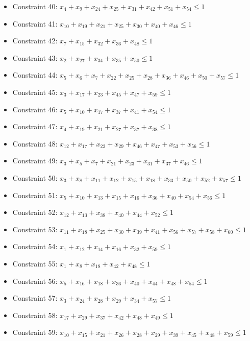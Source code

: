 \documentclass[11pt]{article}
\begin{document}
\begin{itemize}
\item Constraint 40: $x_{4} + x_{9} + x_{24} + x_{25} + x_{31} + x_{42} + x_{51} + x_{54} \le 1$
\item Constraint 41: $x_{10} + x_{19} + x_{21} + x_{25} + x_{30} + x_{40} + x_{46} \le 1$
\item Constraint 42: $x_{7} + x_{15} + x_{32} + x_{36} + x_{48} \le 1$
\item Constraint 43: $x_{2} + x_{27} + x_{34} + x_{35} + x_{50} \le 1$
\item Constraint 44: $x_{5} + x_{6} + x_{7} + x_{22} + x_{25} + x_{28} + x_{36} + x_{46} + x_{50} + x_{57} \le 1$
\item Constraint 45: $x_{3} + x_{17} + x_{23} + x_{45} + x_{47} + x_{59} \le 1$
\item Constraint 46: $x_{5} + x_{10} + x_{17} + x_{37} + x_{41} + x_{54} \le 1$
\item Constraint 47: $x_{4} + x_{19} + x_{21} + x_{27} + x_{37} + x_{38} \le 1$
\item Constraint 48: $x_{12} + x_{17} + x_{22} + x_{29} + x_{46} + x_{47} + x_{53} + x_{56} \le 1$
\item Constraint 49: $x_{3} + x_{5} + x_{7} + x_{21} + x_{23} + x_{31} + x_{37} + x_{46} \le 1$
\item Constraint 50: $x_{3} + x_{8} + x_{11} + x_{12} + x_{15} + x_{18} + x_{33} + x_{50} + x_{52} + x_{57} \le 1$
\item Constraint 51: $x_{5} + x_{10} + x_{13} + x_{15} + x_{16} + x_{36} + x_{40} + x_{54} + x_{56} \le 1$
\item Constraint 52: $x_{12} + x_{13} + x_{38} + x_{40} + x_{44} + x_{52} \le 1$
\item Constraint 53: $x_{11} + x_{18} + x_{25} + x_{30} + x_{39} + x_{41} + x_{56} + x_{57} + x_{58} + x_{60} \le 1$
\item Constraint 54: $x_{1} + x_{12} + x_{14} + x_{16} + x_{32} + x_{59} \le 1$
\item Constraint 55: $x_{1} + x_{8} + x_{18} + x_{42} + x_{48} \le 1$
\item Constraint 56: $x_{5} + x_{16} + x_{18} + x_{36} + x_{40} + x_{44} + x_{48} + x_{54} \le 1$
\item Constraint 57: $x_{3} + x_{24} + x_{28} + x_{29} + x_{34} + x_{57} \le 1$
\item Constraint 58: $x_{17} + x_{29} + x_{37} + x_{42} + x_{48} + x_{49} \le 1$
\item Constraint 59: $x_{10} + x_{15} + x_{21} + x_{26} + x_{28} + x_{29} + x_{39} + x_{45} + x_{48} + x_{59} \le 1$

\end{itemize}
\end{document}
